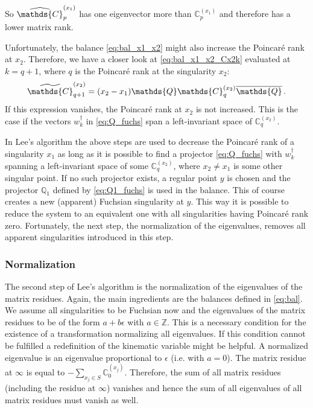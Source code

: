 \documentclass[12pt]{article}
\numberwithin{equation}{section}
\numberwithin{figure}{section}
\newcommand{\C}{\mathds{C}}
\newcommand{\Q}{\mathds{Q}}
\newcommand{\Qbar}{\overline\Q}
\begin{document}
        So $\widehat \C^{(x_1)}_p$ has one eigenvector more than $\C^{(x_1)}_p$ and therefore has a lower matrix rank.
        
        Unfortunately, the balance \eqref{eq:bal_x1_x2} might also increase the Poincar\'{e} rank at $x_2$.
				Therefore, we have a closer look at \eqref{eq:bal_x1_x2_Cx2k} evaluated at $k=q+1$, where $q$ is the Poincar\'{e} rank at the singularity $x_2$:
        \[
          \widetilde \C^{(x_2)}_{q+1} 
          =
          (x_2-x_1)
          \Q \C^{(x_2)}_q \Qbar\,.
        \]
        If this expression vanishes, the Poincar\'{e} rank at $x_2$ is not increased.
        This is the case if the vectors $w_k^\dagger$ in \eqref{eq:Q_fuchs} span a left-invariant space of $\C^{(x_2)}_q$.
        
				In Lee's algorithm the above steps are used to decrease the Poincar\'{e} rank of a singularity $x_1$ as long as it is possible to find a projector \eqref{eq:Q_fuchs} with $w_k^\dagger$ spanning a left-invariant space of some $\C^{(x_2)}_q$, where $x_2 \neq x_1$ is some other singular point.
        If no such projector exists, a regular point $y$ is chosen and the projector $\Q_1$ defined by \eqref{eq:Q1_fuchs} is used in the balance.
        This of course creates a new (apparent) Fuchsian singularity at $y$.
        This way it is possible to reduce the system to an equivalent one with all singularities having Poincar\'{e} rank zero.
        Fortunately, the next step, the normalization of the eigenvalues, removes all apparent singularities introduced in this step.
      \subsubsection*{Normalization}
				The second step of Lee's algorithm is the normalization of the eigenvalues of the matrix residues.
        Again, the main ingredients are the balances defined in \eqref{eq:bal}.
        We assume all singularities to be Fuchsian now and the eigenvalues of the matrix residues to be of the form $a+b\epsilon$ with $a\in\mathds{Z}$.
        This is a necessary condition for the existence of a transformation normalizing all eigenvalues.
				If this condition cannot be fulfilled a redefinition of the kinematic variable might be helpful.
        A normalized eigenvalue is an eigenvalue proportional to $\epsilon$ (i.e. with $a=0$).
        The matrix residue at $\infty$ is equal to $-\sum_{x_j\in S} \C^{(x_j)}_0$.
        Therefore, the sum of all matrix residues (including the residue at $\infty$) vanishes and hence the sum of all eigenvalues of all matrix residues must vanish as well.
\end{document}
